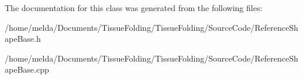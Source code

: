 The documentation for this class was generated from the following files\+:\begin{DoxyCompactItemize}
\item 
/home/melda/\+Documents/\+Tissue\+Folding/\+Tissue\+Folding/\+Source\+Code/Reference\+Shape\+Base.\+h\item 
/home/melda/\+Documents/\+Tissue\+Folding/\+Tissue\+Folding/\+Source\+Code/Reference\+Shape\+Base.\+cpp\end{DoxyCompactItemize}
